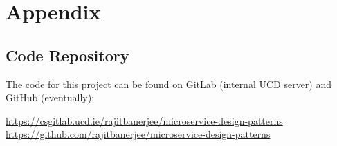 \chapter{Appendix}


\section{Code Repository}

The code for this project can be found on GitLab (internal UCD server) and GitHub (eventually):

\url{https://csgitlab.ucd.ie/rajitbanerjee/microservice-design-patterns}
\linebreak
\url{https://github.com/rajitbanerjee/microservice-design-patterns}



